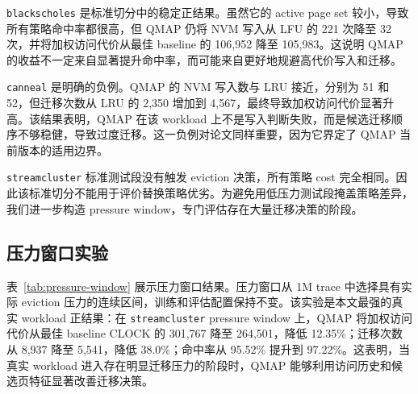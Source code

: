 \texttt{blackscholes} 是标准切分中的稳定正结果。虽然它的 active page set 较小，导致所有策略命中率都很高，但 QMAP 仍将 NVM 写入从 LFU 的 221 次降至 32 次，并将加权访问代价从最佳 baseline 的 106,952 降至 105,983。这说明 QMAP 的收益不一定来自显著提升命中率，而可能来自更好地规避高代价写入和迁移。

\texttt{canneal} 是明确的负例。QMAP 的 NVM 写入数与 LRU 接近，分别为 51 和 52，但迁移次数从 LRU 的 2,350 增加到 4,567，最终导致加权访问代价显著升高。该结果表明，QMAP 在该 workload 上不是写入判断失败，而是候选迁移顺序不够稳健，导致过度迁移。这一负例对论文同样重要，因为它界定了 QMAP 当前版本的适用边界。

\texttt{streamcluster} 标准测试段没有触发 eviction 决策，所有策略 cost 完全相同。因此该标准切分不能用于评价替换策略优劣。为避免用低压力测试段掩盖策略差异，我们进一步构造 pressure window，专门评估存在大量迁移决策的阶段。

\subsection{压力窗口实验}

表~\ref{tab:pressure-window} 展示压力窗口结果。压力窗口从 1M trace 中选择具有实际 eviction 压力的连续区间，训练和评估配置保持不变。该实验是本文最强的真实 workload 正结果：在 \texttt{streamcluster} pressure window 上，QMAP 将加权访问代价从最佳 baseline CLOCK 的 301,767 降至 264,501，降低 12.35\%；迁移次数从 8,937 降至 5,541，降低 38.0\%；命中率从 95.52\% 提升到 97.22\%。这表明，当真实 workload 进入存在明显迁移压力的阶段时，QMAP 能够利用访问历史和候选页特征显著改善迁移决策。

